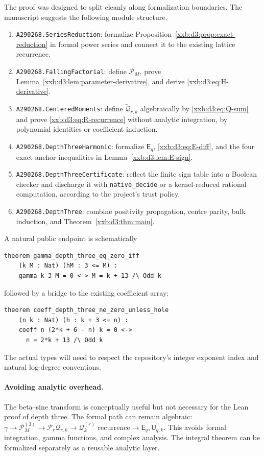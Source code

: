 \documentclass[11pt,a4paper]{article}
\numberwithin{equation}{section}
\theoremstyle{definition}
\theoremstyle{remark}
\theoremstyle{plain}
\begin{document}
The proof was designed to split cleanly along formalization boundaries.
The manuscript suggests the following module structure.
\begin{enumerate}[nosep]
  \item \texttt{A290268.SeriesReduction}: formalize
  Proposition~\ref{xxb:d3:prop:exact-reduction} in formal power series and
  connect it to the existing lattice recurrence.
  \item \texttt{A290268.FallingFactorial}: define $\mathcal P_M$, prove
  Lemma~\ref{xxb:d3:lem:parameter-derivative}, and derive
  \eqref{xxb:d3:eq:H-derivative}.
  \item \texttt{A290268.CenteredMoments}: define $\widetilde{\mathcal Q}_{r,k}$
  algebraically by \eqref{xxb:d3:eq:Q-sum} and prove
  \eqref{xxb:d3:eq:R-recurrence} without analytic integration, by polynomial
  identities or coefficient induction.
  \item \texttt{A290268.DepthThreeHarmonic}: formalize $\mathsf E_q$,
  \eqref{xxb:d3:eq:E-diff}, and the four exact anchor inequalities in
  Lemma~\ref{xxb:d3:lem:E-sign}.
  \item \texttt{A290268.DepthThreeCertificate}: reflect the finite sign table
  into a Boolean checker and discharge it with \texttt{native\_decide} or a
  kernel-reduced rational computation, according to the project's trust
  policy.
  \item \texttt{A290268.DepthThree}: combine positivity propagation, centre
  parity, bulk induction, and Theorem~\ref{xxb:d3:thm:main}.
\end{enumerate}
A natural public endpoint is schematically
\begin{lstlisting}
theorem gamma_depth_three_eq_zero_iff
    (k M : Nat) (hM : 3 <= M) :
    gamma k 3 M = 0 <-> M = k + 13 /\ Odd k
\end{lstlisting}
followed by a bridge to the existing coefficient array:
\begin{lstlisting}
theorem coeff_depth_three_ne_zero_unless_hole
    (n k : Nat) (h : k + 3 <= n) :
    coeff n (2*k + 6 - n) k = 0 <->
      n = 2*k + 13 /\ Odd k
\end{lstlisting}
The actual types will need to respect the repository's integer exponent index
and natural log-degree conventions.

\paragraph{Avoiding analytic overhead.}
The beta--sine transform is conceptually useful but not necessary for the Lean
proof of depth three.  The formal path can remain algebraic:
$\gamma\to\mathcal P_M^{(3)}\to\mathcal P_r\widetilde{\mathcal Q}_{r,k}
\to\mathcal Q_k^{(r)}\text{ recurrence}\to\mathsf E_q,\mathsf U_{q,k}$.
This avoids formal integration, gamma functions, and complex analysis.  The
integral theorem can be formalized separately as a reusable analytic layer.
\end{document}
